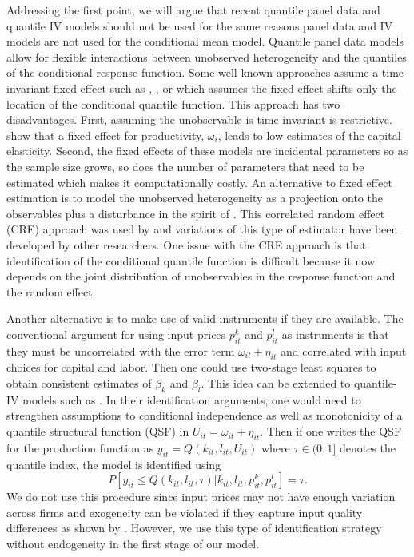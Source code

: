 \documentclass[11pt]{article}
\begin{document}
Addressing the first point, we will argue that recent quantile panel data and quantile IV models should not be used for the same reasons panel data and IV models are not used for the conditional mean model. Quantile panel data models allow for flexible interactions between unobserved heterogeneity and the quantiles of the conditional response function. Some well known approaches assume a time-invariant fixed effect such as \cite{Koenker2004}, \cite{Lamarche2010}, or \cite{Canay2011} which assumes the fixed effect shifts only the location of the conditional quantile function. This approach has two disadvantages. First, assuming the unobservable is time-invariant is restrictive. \cite{Griliches1986} show that a fixed effect for productivity, $\omega_{i}$, leads to low estimates of the capital elasticity. Second, the fixed effects of these models are incidental parameters so as the sample size grows, so does the number of parameters that need to be estimated which makes it computationally costly. An alternative to fixed effect estimation is to model the unobserved heterogeneity as a projection onto the observables plus a disturbance in the spirit of \cite{Chamberlain1984}. This correlated random effect (CRE) approach was used by \cite{Abrevaya2008} and variations of this type of estimator have been developed by other researchers. One issue with the CRE approach is that identification of the conditional quantile function is difficult because it now depends on the joint distribution of unobservables in the response function and the random effect.

Another alternative is to make use of valid instruments if they are available. The conventional argument for using input prices $p^{k}_{it}$ and $p^{l}_{it}$ as instruments is that they must be uncorrelated with the error term $\omega_{it}+\eta_{it}$ and correlated with input choices for capital and labor. Then one could use two-stage least squares to obtain consistent estimates of $\beta_{k}$ and $\beta_{l}$. This idea can be extended to quantile-IV models such as \cite{Chernozhukov2005}. In their identification arguments, one would need to strengthen assumptions to conditional independence as well as monotonicity of a quantile structural function (QSF) in $U_{it}=\omega_{it}+\eta_{it}$. Then if one writes the QSF for the production function as $y_{it}=Q(k_{it}, l_{it}, U_{it})$ where $\tau\in (0,1]$ denotes the quantile index, the model is identified using
\begin{equation}
P[y_{it}\leq Q(k_{it}, l_{it}, \tau)|k_{it}, l_{it}, p^{k}_{it}, p^{l}_{it}]=\tau.
\end{equation}
We do not use this procedure since input prices may not have enough variation across firms and exogeneity can be violated if they capture input quality differences as shown by \cite{Griliches1986}. However, we use this type of identification strategy without endogeneity in the first stage of our model.
\end{document}
